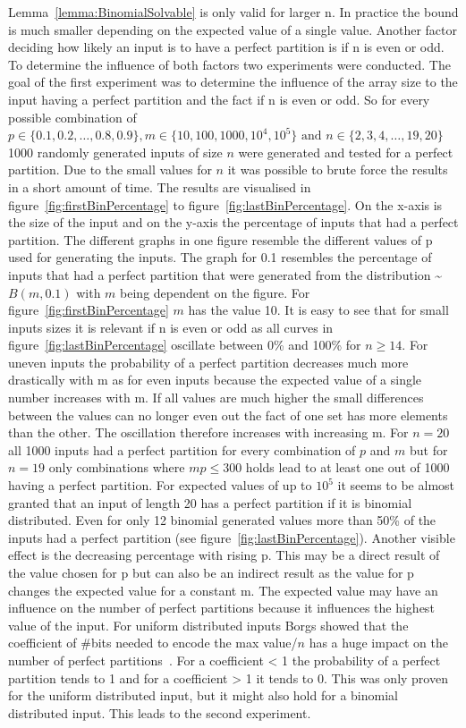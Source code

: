 Lemma~\ref{lemma:BinomialSolvable} is only valid for larger n. In practice the bound is much smaller depending on the expected value of a single value. Another factor deciding how likely an input is to have a perfect partition is if n is even or odd. To determine the influence of both factors two experiments were conducted. The goal of the first experiment was to determine the influence of the array size to the input having a perfect partition and the fact if n is even or odd. So for every possible combination of $p \in \{0.1, 0.2, \dots , 0.8, 0.9\}, m \in \{10,100,1000,10^4,10^5\} \text{ and } n \in \{2,3,4,\dots,19,20\}$ 1000 randomly generated inputs of size $n$ were generated and tested for a perfect partition. Due to the small values for $n$ it was possible to brute force the results in a short amount of time. The results are visualised in figure~\ref{fig:firstBinPercentage} to figure~\ref{fig:lastBinPercentage}. 
On the x-axis is the size of the input and on the y-axis the percentage of inputs that had a perfect partition. The different graphs in one figure resemble the different values of p used for generating the inputs. The graph for 0.1 resembles the percentage of inputs that had a perfect partition that were generated from the distribution \textasciitilde$B(m,0.1)$ with $m$ being dependent on the figure. For figure~\ref{fig:firstBinPercentage} $m$ has the value 10.\newline
It is easy to see that for small inputs sizes it is relevant if n is even or odd as all curves in figure~\ref{fig:lastBinPercentage} oscillate between 0\% and 100\% for $n\ge14$. For uneven inputs the probability of a perfect partition decreases much more drastically with m as for even inputs because the expected value of a single number increases with m. If all values are much higher the small differences between the values can no longer even out the fact of one set has more elements than the other. The oscillation therefore increases with increasing m. For $n=20$ all 1000 inputs had a perfect partition for every combination of $p$ and $m$ but for $n=19$ only combinations where $mp\le300$ holds lead to at least one out of 1000 having a perfect partition. For expected values of up to $10^5$ it seems to be almost granted that an input of length 20 has a perfect partition if it is binomial distributed.
Even for only 12 binomial generated values more than 50\% of the inputs had a perfect partition (see figure~\ref{fig:lastBinPercentage}). Another visible effect is the decreasing percentage with rising p. This may be a direct result of the value chosen for p but can also be an indirect result as the value for p changes the expected value for a constant m. The expected value may have an influence on the number of perfect partitions because it influences the highest value of the input.
For uniform distributed inputs Borgs showed that the coefficient of \#bits needed to encode the max value/$n$ has a huge impact on the number of perfect partitions~\cite{borgs2001phase}. For a coefficient < 1 the probability of a perfect partition tends to 1 and for a coefficient > 1 it tends to 0. This was only proven for the uniform distributed input, but it might also hold for a binomial distributed input. This leads to the second experiment.

